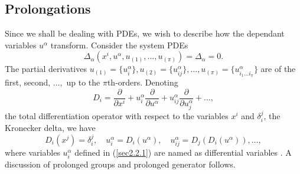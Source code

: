 \subsection{Prolongations\label{pr}}
Since we shall be dealing with PDEs, we wish to describe how the dependant variables $u^{\alpha}$ transform. Consider the  system PDEs
\begin{equation}
\Delta_{\alpha}\left(x^i, u^{\alpha} , u_{(1)}, \ldots,u_{(\pi)}\right) = \Delta_{\alpha}=0. \label{pi-thorderpde}
\end{equation} The partial derivatives $ u_{(1)}=\{ u_{i}^{\alpha}\}, u_{(2)}=\{ u_{ij}^{\alpha}\} , \ldots, u_{(\pi)}=\{ u_{i_1\ldots i_{\pi}}^{\alpha}\}$ are  of the first, second, $\ldots,$ up to the $\pi$th-orders. Denoting  \begin{equation}
D_i = \frac{ \partial }{ \partial x^i} + u_{i}^{\alpha } \frac{ \partial }{ \partial u^{\alpha }} + u_{ij}^{\alpha } \frac{ \partial }{ \partial u_{j}^{\alpha }}+ \ldots, \label{sec2.2.2}
\end{equation} the  total differentiation operator with respect to the variables $x^i$ and $ \delta_i^j$,  the Kronecker delta, we have
\begin{equation} \label{sec2.2.1} D_i(x^j)= \delta_i^j,\quad 
u_{i}^{\alpha}= D_i( u^{\alpha}), \quad u_{ij}^{\alpha}= D_{j}(D_{i}( u^{\alpha})),\ldots,
\end{equation} where variables $u^{\alpha}_{i} $ defined in (\ref{sec2.2.1}) are named as differential variables \citep{ibragimov}. A discussion of prolonged groups and prolonged generator follows.
